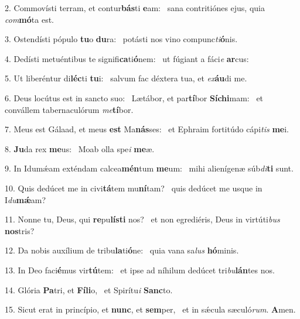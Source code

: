 2. Commovísti terram, et contur\textbf{bás}ti \textbf{e}am: \ast\  sana contritiónes ejus, quia \textit{com}\textbf{mó}ta est.\

3. Ostendísti pópulo \textbf{tu}o \textbf{du}ra: \ast\  potásti nos vino compunc\textit{ti}\textbf{ó}nis.\

4. Dedísti metuéntibus te signifi\textbf{ca}ti\textbf{ó}nem: \ast\  ut fúgiant a fáci\textit{e} \textbf{ar}cus:\

5. Ut liberéntur di\textbf{léc}ti \textbf{tu}i: \ast\  salvum fac déxtera tua, et \textit{ex}\textbf{áu}di me.\

6. Deus locútus est in sancto suo: \dag\  Lætábor, et par\textbf{tí}bor \textbf{Sí}\textbf{chi}mam: \ast\  et convállem tabernaculórum \textit{me}\textbf{tí}bor.\

7. Meus est Gálaad, et meus \textbf{est} Ma\textbf{nás}ses: \ast\  et Ephraim fortitúdo cápi\textit{tis} \textbf{me}i.\

8. \textbf{Ju}da rex \textbf{me}us: \ast\  Moab olla spe\textit{i} \textbf{me}æ.\

9. In Idumǽam exténdam calcea\textbf{mén}tum \textbf{me}um: \ast\  mihi alienígenæ súb\textit{di}\textbf{ti} sunt.\

10. Quis dedúcet me in civi\textbf{tá}tem mu\textbf{ní}tam? \ast\  quis dedúcet me usque in I\textit{du}\textbf{mǽ}am?\

11. Nonne tu, Deus, qui \textbf{re}pu\textbf{lís}\textbf{ti} nos? \ast\  et non egrediéris, Deus in virtúti\textit{bus} \textbf{nos}tris?\

12. Da nobis auxílium de tribu\textbf{la}ti\textbf{ó}ne: \ast\  quia vana sa\textit{lus} \textbf{hó}minis.\

13. In Deo faci\textbf{é}mus vir\textbf{tú}tem: \ast\  et ipse ad níhilum dedúcet tri\textit{bu}\textbf{lán}tes nos.\

14. Glória \textbf{Pa}tri, et \textbf{Fí}\textbf{li}o, \ast\  et Spirítu\textit{i} \textbf{Sanc}to.\

15. Sicut erat in princípio, et \textbf{nunc}, et \textbf{sem}per, \ast\  et in sǽcula sæculó\textit{rum}. \textbf{A}men.\

